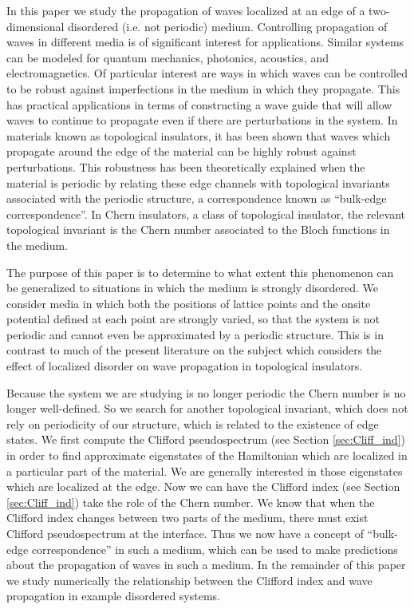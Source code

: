 \documentclass[a4paper]{article}
\begin{document}
In this paper we study the propagation of waves localized at an edge of a two-dimensional disordered (i.e. not periodic) medium. Controlling propagation of waves in different media is of significant interest for applications. Similar systems can be modeled for quantum mechanics, photonics, acoustics, and electromagnetics. Of particular interest are ways in which waves can be controlled to be robust against imperfections in the medium in which they propagate. This has practical applications in terms of constructing a wave guide that will allow waves to continue to propagate even if there are perturbations in the system. In materials known as topological insulators, it has been shown that waves which propagate around the edge of the material can be highly robust against perturbations. This robustness has been theoretically explained when the material is periodic by relating these edge channels with topological invariants associated with the periodic structure, a correspondence known as ``bulk-edge correspondence''. In Chern insulators, a class of topological insulator, the relevant topological invariant is the Chern number associated to the Bloch functions in the medium.

The purpose of this paper is to determine to what extent this phenomenon can be generalized to situations in which the medium is strongly disordered. We consider media in which both the positions of lattice points and the onsite potential defined at each point are strongly varied, so that the system is not periodic and cannot even be approximated by a periodic structure. This is in contrast to much of the present literature on the subject which considers the effect of localized disorder on wave propagation in topological insulators. 

Because the system we are studying is no longer periodic the Chern number is no longer well-defined. So we search for another topological invariant, which does not rely on periodicity of our structure, which is related to the existence of edge states. We first compute the Clifford pseudospectrum (see Section \ref{sec:Cliff_ind}) in order to find approximate eigenstates of the Hamiltonian which are localized in a particular part of the material. We are generally interested in those eigenstates which are localized at the edge. Now we can have the Clifford index (see Section \ref{sec:Cliff_ind}) take the role of the Chern number. We know that when the Clifford index changes between two parts of the medium, there must exist Clifford pseudospectrum at the interface. Thus we now have a concept of ``bulk-edge correspondence'' in such a medium, which can be used to make predictions about the propagation of waves in such a medium. In the remainder of this paper we study numerically the relationship between the Clifford index and wave propagation in example disordered systems.
\end{document}
